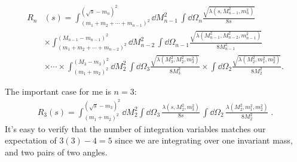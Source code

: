 \begin{equation}
\begin{aligned}
    R_n&(s) 
        = 
    \int_{(m_1 + m_2 + \cdots + m_{n-1})^2}^{(\sqrt{s} - m_n)^2}
    \dd M^2_{n-1} \,  \int \dd \Omega_n
    \frac{\sqrt{\lambda(s, M_{n-1}^2, m_n^2)}}{8s} \\
        &\times 
    \int_{(m_1 + m_2 + \cdots + m_{n-2})^2}^{(M_{n-1} - m_{n-1})^2}
    \dd M^2_{n-2}  \, \int \dd \Omega_{n-1}
    \frac{\sqrt{\lambda(M_{n-1}^2, M_{n-2}^2, m_{n-1}^2)}}{8M_{n-1}^2} \\
        &\times \cdots \times
    \int_{(m_1 + m_2)^2}^{(M_3 - m_3)^2}
    \dd M^2_{2}  \, \int \dd \Omega_{3}
    \frac{\sqrt{\lambda(M_{3}^2, M_{2}^2, m_{3}^2)}}{8M_{3}^2} 
    \times 
    \int \dd \Omega_2
    \frac{\sqrt{\lambda(M_{2}^2, m_1^2, m_{2}^2)}}{8M_{2}^2}. 
\end{aligned}
\end{equation}

The important case for me is $n = 3$:
\begin{equation}
\begin{aligned}
    R_3(s) = 
        \int_{(m_1 + m_2)^2}^{(\sqrt{s} - m_3)^2} \dd M_{2}^2 
        \int \dd \Omega_3 \,
        \frac{\lambda (s, M^2_{2}, m_3^2)}{8s} \,
        \int \dd \Omega_2 \,
        \frac{\lambda (M^2_2, m_1^2, m_2^2)}{8 M_2^2} \; .
\end{aligned}
\end{equation}
It's easy to verify that the number of integration variables matches our expectation of $3(3) - 4 = 5$ since we are integrating over one invariant mass, and two pairs of two angles. 

